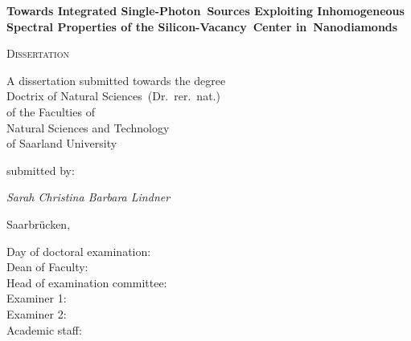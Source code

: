 




\begin{titlepage}
	\centering
	\null\vfill

	{\huge\bfseries Towards Integrated Single-Photon~Sources Exploiting Inhomogeneous Spectral Properties of the Silicon-Vacancy~Center in~Nanodiamonds\par}



	\vfill

	{\scshape\Large Dissertation}
	\vfill


	{\large A dissertation submitted towards the degree\\
	Doctrix of Natural Sciences~(Dr.~rer.~nat.)\\
	of the Faculties of\\
  Natural Sciences and Technology\\
	of Saarland University}


	\vfill
	submitted by:
	\vfill

	{\Large\itshape Sarah Christina Barbara Lindner}

	\vfill

	{\large Saarbr\"ucken, \thesisdate{}}
	\vfill
\end{titlepage}



\newpage
\thispagestyle{plain}
\null
\vfill
\begin{description}
	\item[Day of doctoral examination:] %
 	\item[Dean of Faculty:] %
 	\item[Head of examination committee:] %
	\item[Examiner 1:] %
	\item[Examiner 2:] %
	\item[Academic staff:] %
\end{description}

\newpage



